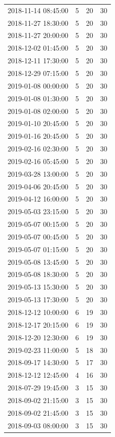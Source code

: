 \begin{tabular}{lrrr}
2018-11-14 08:45:00 & 5 & 20 & 30 \\
2018-11-27 18:30:00 & 5 & 20 & 30 \\
2018-11-27 20:00:00 & 5 & 20 & 30 \\
2018-12-02 01:45:00 & 5 & 20 & 30 \\
2018-12-11 17:30:00 & 5 & 20 & 30 \\
2018-12-29 07:15:00 & 5 & 20 & 30 \\
2019-01-08 00:00:00 & 5 & 20 & 30 \\
2019-01-08 01:30:00 & 5 & 20 & 30 \\
2019-01-08 02:00:00 & 5 & 20 & 30 \\
2019-01-10 20:45:00 & 5 & 20 & 30 \\
2019-01-16 20:45:00 & 5 & 20 & 30 \\
2019-02-16 02:30:00 & 5 & 20 & 30 \\
2019-02-16 05:45:00 & 5 & 20 & 30 \\
2019-03-28 13:00:00 & 5 & 20 & 30 \\
2019-04-06 20:45:00 & 5 & 20 & 30 \\
2019-04-12 16:00:00 & 5 & 20 & 30 \\
2019-05-03 23:15:00 & 5 & 20 & 30 \\
2019-05-07 00:15:00 & 5 & 20 & 30 \\
2019-05-07 00:45:00 & 5 & 20 & 30 \\
2019-05-07 01:15:00 & 5 & 20 & 30 \\
2019-05-08 13:45:00 & 5 & 20 & 30 \\
2019-05-08 18:30:00 & 5 & 20 & 30 \\
2019-05-13 15:30:00 & 5 & 20 & 30 \\
2019-05-13 17:30:00 & 5 & 20 & 30 \\
2018-12-12 10:00:00 & 6 & 19 & 30 \\
2018-12-17 20:15:00 & 6 & 19 & 30 \\
2018-12-20 12:30:00 & 6 & 19 & 30 \\
2019-02-23 11:00:00 & 5 & 18 & 30 \\
2018-09-17 14:30:00 & 5 & 17 & 30 \\
2018-12-12 12:45:00 & 4 & 16 & 30 \\
2018-07-29 19:45:00 & 3 & 15 & 30 \\
2018-09-02 21:15:00 & 3 & 15 & 30 \\
2018-09-02 21:45:00 & 3 & 15 & 30 \\
2018-09-03 08:00:00 & 3 & 15 & 30 \\

\end{tabular}
